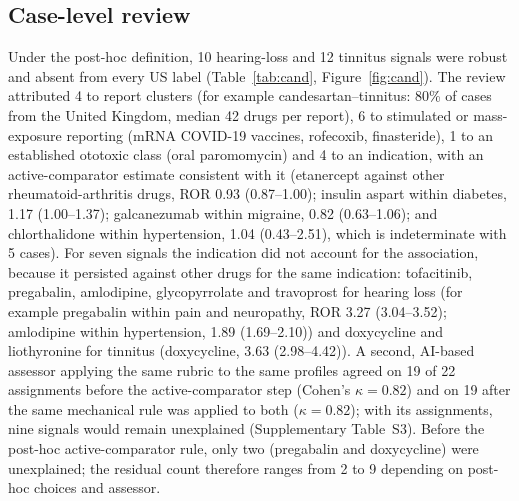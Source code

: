 \subsection{Case-level review}
Under the post-hoc definition, 10 hearing-loss and 12 tinnitus signals were robust and absent from every US
label (Table~\ref{tab:cand}, Figure~\ref{fig:cand}). The review attributed 4 to report clusters (for
example candesartan--tinnitus: 80\%
of cases from the United Kingdom, median 42 drugs per
report), 6 to stimulated or mass-exposure reporting (mRNA COVID-19 vaccines, rofecoxib, finasteride),
1 to an established ototoxic class (oral paromomycin) and 4 to an indication, with an
active-comparator estimate consistent with it (etanercept against other rheumatoid-arthritis drugs,
ROR 0.93 (0.87--1.00); insulin aspart within diabetes, 1.17 (1.00--1.37); galcanezumab within migraine,
0.82 (0.63--1.06); and chlorthalidone within hypertension, 1.04 (0.43--2.51), which is indeterminate with
5 cases). For seven signals the
indication did not account for the association, because it persisted against other drugs for the same indication:
tofacitinib, pregabalin, amlodipine, glycopyrrolate and travoprost for hearing loss (for example pregabalin within pain and neuropathy, ROR 3.27 (3.04--3.52); amlodipine
within hypertension, 1.89 (1.69--2.10)) and doxycycline and liothyronine for tinnitus (doxycycline, 3.63 (2.98--4.42)).
A second, AI-based assessor applying the same rubric to the same profiles agreed on 19 of 22 assignments
before the active-comparator step (Cohen's $\kappa=0.82$) and on 19 after the same mechanical rule
was applied to both ($\kappa=0.82$); with its assignments, nine signals would remain unexplained
(Supplementary Table~S3). Before the post-hoc active-comparator rule, only two (pregabalin and doxycycline)
were unexplained; the residual count therefore ranges from 2 to 9 depending on post-hoc choices and assessor.
